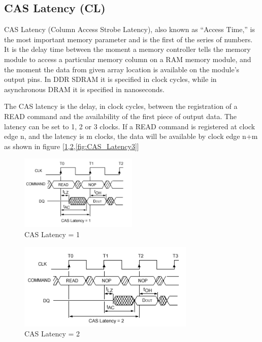 \documentclass[12pt]{article}
\begin{document}
\subsection{CAS Latency (CL)}
CAS Latency (Column Access Strobe Latency), also known as “Access Time,” is the most important memory parameter and is the first of the series of numbers. It is the delay time between the moment a memory controller tells the memory module to access a particular memory column on a RAM memory module, and the moment the data from given array location is available on the module's output pins. In DDR SDRAM it is specified in clock cycles, while in asynchronous DRAM it is specified in nanoseconds\cite{website}.

The CAS latency is the delay, in clock cycles, between the registration of a READ command and the availability of the first piece of output data. The latency can be set to 1, 2 or 3 clocks. If a READ command is registered at clock edge n, and the latency is m clocks, the data will be available by clock edge n+m as shown in figure [\ref{fig:CAS_Latency1},\ref{fig:CAS_Latency2},\ref{fig:CAS_Latency3}]

\begin{figure}[H]
	\centering
		\includegraphics[width=0.5\textwidth]{./images/CAS_Latency1.png}
	\caption{CAS Latency = 1}
	\label{fig:CAS_Latency1}
\end{figure}

\begin{figure}[H]
	\centering
		\includegraphics[width=0.75\textwidth]{./images/CAS_Latency2.png}
	\caption{CAS Latency = 2}
	\label{fig:CAS_Latency2}
\end{figure}
\end{document}
